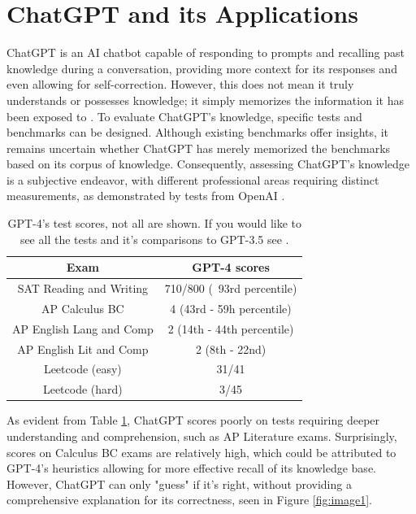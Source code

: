 \documentclass[letterpaper, 10pt, conference]{ieeeconf}
\begin{document}
   \section{ChatGPT and its Applications}
        ChatGPT is an AI chatbot capable of responding to prompts and recalling past knowledge during a conversation, providing more context for its responses and even allowing for self-correction. However, this does not mean it truly understands or possesses knowledge; it simply memorizes the information it has been exposed to \cite{bubeck2023sparks}. To evaluate ChatGPT's knowledge, specific tests and benchmarks can be designed. Although existing benchmarks offer insights, it remains uncertain whether ChatGPT has merely memorized the benchmarks based on its corpus of knowledge. Consequently, assessing ChatGPT's knowledge is a subjective endeavor, with different professional areas requiring distinct measurements, as demonstrated by tests from OpenAI \cite{openai2023gpt4}.

        \begin{table}
            \centering
            \caption{GPT-4's test scores, not all are shown. If you would like to see all the tests and it's comparisons to GPT-3.5 see \cite{openai2023gpt4}.}
            \label{tab:table1}
            \begin{tabular}{c|c}
                Exam & GPT-4 scores\\
                \hline
                SAT Reading and Writing & 710/800 (~93rd percentile)\\
                AP Calculus BC & 4 (43rd - 59h percentile)\\
                AP English Lang and Comp & 2 (14th - 44th percentile)\\
                AP English Lit and Comp & 2 (8th - 22nd)\\
                Leetcode (easy) & 31/41 \\
                Leetcode (hard) & 3/45 \\
                \hline
        
            \end{tabular}

        \end{table}

        As evident from Table \ref{tab:table1}, ChatGPT scores poorly on tests requiring deeper understanding and comprehension, such as AP Literature exams. Surprisingly, scores on Calculus BC exams are relatively high, which could be attributed to GPT-4's heuristics allowing for more effective recall of its knowledge base\cite{bubeck2023sparks}. However, ChatGPT can only "guess" if it's right, without providing a comprehensive explanation for its correctness, seen in Figure \ref{fig:image1}. 
\end{document}
